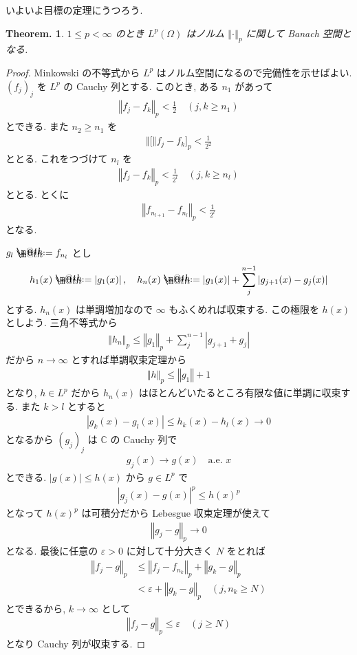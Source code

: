 \documentclass[openany, a4paper, oneside]{jsbook}
\makeatletter
\newcommand*{\defeq}{\mathrel{\rlap{%
\raisebox{0.3ex}{$\m@th\cdot$}}%
\raisebox{-0.3ex}{$\m@th\cdot$}}%
=}
\theoremstyle{break}
\theoremstyle{breakdefn}
\newtheorem{thm}{Theorem.}[section]
\newcommand{\abs}[1]{\left|#1\right|}
\newcommand{\norm}[1]{\left\Vert#1\right\Vert}
\newcommand{\pnorm}[1]{\left\Vert#1\right\Vert_p}
\newcommand{\bbC}{\mathbb{C}}
\makeatother
\begin{document}
いよいよ目標の定理にうつろう.
\begin{thm}
 $1 \le p < \infty$ のとき $L^p(\Omega)$ はノルム $\norm{\cdot}_p$ に関して Banach 空間となる.
\end{thm}
\begin{proof}
Minkowski の不等式から $L^p$ はノルム空間になるので完備性を示せばよい.
$(f_j)_j$ を $L^p$ の Cauchy 列とする.
このとき, ある $n_1$ があって
\begin{align}
 \norm{f_j - f_k}_p
 <
 \frac{1}{2} \quad (j, k \ge n_1)
\end{align}
とできる.
また $n_2 \ge n_1$ を
\begin{align}
 \norm[f_j - f_k]_p
 <
 \frac{1}{2^2}
\end{align}
ととる.
これをつづけて $n_l$ を
\begin{align}
 \norm{f_j - f_k}_p
 <
 \frac{1}{2^l} \quad (j, k \ge n_l)
\end{align}
ととる.
とくに
\begin{align}
 \norm{f_{n_{l + 1}} - f_{n_l}}_p
 <
 \frac{1}{2^l}
\end{align}
となる.

$g_l \defeq f_{n_l}$ とし
\begin{align}
 h_1(x)
 \defeq
 \abs{g_1 (x)}, \quad
 h_n(x)
 \defeq
 \abs{g_1(x)} + \sum_j^{n-1} \abs{g_{j+1}(x) - g_j(x)}
\end{align}
とする.
$h_n(x)$ は単調増加なので $\infty$ もふくめれば収束する.
この極限を $h(x)$ としよう.
三角不等式から
\begin{align}
 \norm{h_n}_p
 \leq
 \norm{g_1}_p + \sum_{j}^{n - 1} \abs{g_{j + 1} + g_j}
\end{align}
だから $n \to \infty$ とすれば単調収束定理から
\begin{align}
 \norm{h}_p
 \leq
 \norm{g_1} + 1
\end{align}
となり, $h \in L^p$ だから $h_n(x)$ はほとんどいたるところ有限な値に単調に収束する.
また $k > l$ とすると
\begin{align}
 \abs{g_k(x) - g_l(x)}
 \leq
 h_k(x) - h_l(x) \to 0
\end{align}
となるから $(g_j)_j$ は $\bbC$ の Cauchy 列で
\begin{align}
 g_j(x) \to g(x) \quad \text{a.e. } x
\end{align}
とできる.
$\abs{g(x)} \leq h(x)$ から $g \in L^p$ で
\begin{align}
 \abs{g_j(x) - g(x)}^p
 \leq
 h(x)^p
\end{align}
となって $h(x)^p$ は可積分だから Lebesgue 収束定理が使えて
\begin{align}
 \pnorm{g_j - g} \to 0
\end{align}
となる.
最後に任意の $\varepsilon > 0$ に対して十分大きく $N$ をとれば
\begin{align}
 \pnorm{f_j - g}
 &\leq
 \pnorm{f_j - f_{n_k}} + \pnorm{g_k - g} \\
 &<
 \varepsilon + \pnorm{g_k - g} \quad (j, n_k \geq N)
\end{align}
とできるから, $k \to \infty$ として
\begin{align}
 \pnorm{f_j - g}
 \leq
 \varepsilon \quad (j \geq N)
\end{align}
となり Cauchy 列が収束する.
\end{proof}
\end{document}
